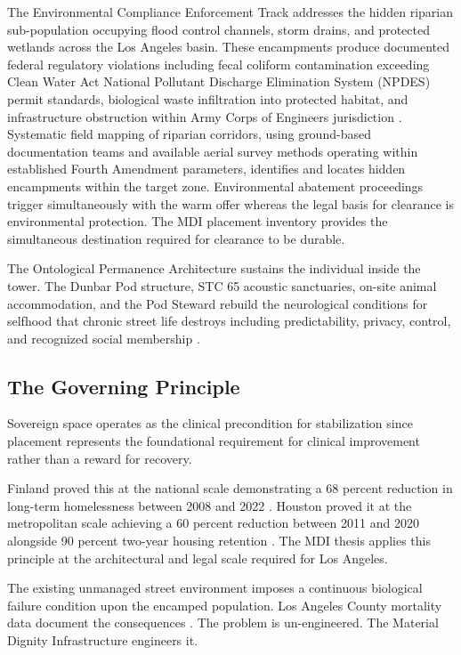 \documentclass[12pt, letterpaper]{article}
\begin{document}
The Environmental Compliance Enforcement Track addresses the hidden riparian sub-population occupying flood control channels, storm drains, and protected wetlands across the Los Angeles basin. These encampments produce documented federal regulatory violations including fecal coliform contamination exceeding Clean Water Act National Pollutant Discharge Elimination System (NPDES) permit standards, biological waste infiltration into protected habitat, and infrastructure obstruction within Army Corps of Engineers jurisdiction \citep{clean_water_act_1972}. Systematic field mapping of riparian corridors, using ground-based documentation teams and available aerial survey methods operating within established Fourth Amendment parameters, identifies and locates hidden encampments within the target zone. Environmental abatement proceedings trigger simultaneously with the warm offer whereas the legal basis for clearance is environmental protection. The MDI placement inventory provides the simultaneous destination required for clearance to be durable.

The Ontological Permanence Architecture sustains the individual inside the tower. The Dunbar Pod structure, STC 65 acoustic sanctuaries, on-site animal accommodation, and the Pod Steward rebuild the neurological conditions for selfhood that chronic street life destroys including predictability, privacy, control, and recognized social membership \citep{giddens_1991, laing_1960}.

\subsection{The Governing Principle}

Sovereign space operates as the clinical precondition for stabilization since placement represents the foundational requirement for clinical improvement rather than a reward for recovery.

Finland proved this at the national scale demonstrating a 68 percent reduction in long-term homelessness between 2008 and 2022 \citep{finland_housing_first_2023}. Houston proved it at the metropolitan scale achieving a 60 percent reduction between 2011 and 2020 alongside 90 percent two-year housing retention \citep{houston_way_home_2024}. The MDI thesis applies this principle at the architectural and legal scale required for Los Angeles.

The existing unmanaged street environment imposes a continuous biological failure condition upon the encamped population. Los Angeles County mortality data document the consequences \citep{la_mortality_2026}. The problem is un-engineered. The Material Dignity Infrastructure engineers it.
\end{document}
